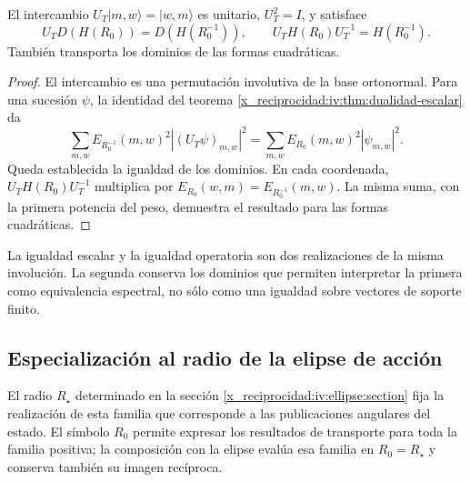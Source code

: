 \begin{theorem}
\label{x_reciprocidad:iv:thm:t-unitaria}
\label{x_reciprocidad:prop:dualidad-radios-k}
El intercambio
\(U_T|m,w\rangle=|w,m\rangle\) es unitario,
\(U_T^2=I\), y satisface
\begin{equation}
 U_TD(H(R_0))=D(H(R_0^{-1})),
 \qquad U_TH(R_0)U_T^{-1}=H(R_0^{-1}).
 \label{x_reciprocidad:iv:eq:conjugacion-h}
\end{equation}
También transporta los dominios de las formas cuadráticas.
\end{theorem}
\begin{proof}
El intercambio es una permutación involutiva de la base
ortonormal. Para una sucesión \(\psi\), la identidad del
teorema \ref{x_reciprocidad:iv:thm:dualidad-escalar} da
\[
 \sum_{m,w}E_{R_0^{-1}}(m,w)^2|(U_T\psi)_{m,w}|^2
 =\sum_{m,w}E_{R_0}(m,w)^2|\psi_{m,w}|^2.
\]
Queda establecida la igualdad de los dominios. En cada coordenada,
\(U_TH(R_0)U_T^{-1}\) multiplica por
\(E_{R_0}(w,m)=E_{R_0^{-1}}(m,w)\). La misma suma, con
la primera potencia del peso, demuestra el resultado para las
formas cuadráticas.
\end{proof}

La igualdad escalar y la igualdad operatoria son dos realizaciones
de la misma involución. La segunda conserva los dominios que
permiten interpretar la primera como equivalencia espectral,
no sólo como una igualdad sobre vectores de soporte finito.

\subsection{Especialización al radio de la elipse de acción}

El radio \(R_\star\) determinado en la sección
\ref{x_reciprocidad:iv:ellipse:section} fija la realización de esta familia que
corresponde a las publicaciones angulares del estado. El símbolo
\(R_0\) permite expresar los resultados de transporte para toda la
familia positiva; la composición con la elipse evalúa esa familia en
\(R_0=R_\star\) y conserva también su imagen recíproca.

